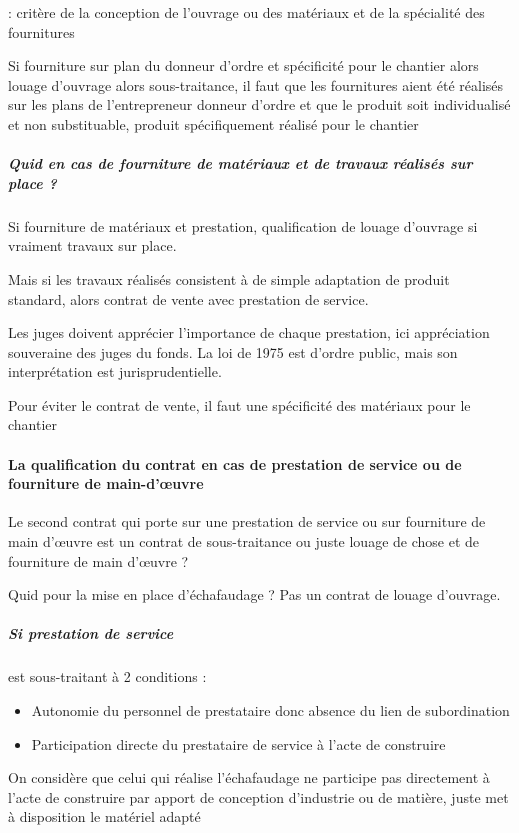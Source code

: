 				  : critère de la conception de l’ouvrage ou des matériaux et de la spécialité des fournitures


				Si fourniture sur plan du donneur d’ordre et spécificité pour le chantier alors louage d’ouvrage alors sous-traitance, il faut que les fournitures aient été réalisés sur les plans de l’entrepreneur donneur d’ordre et que le produit soit individualisé et non substituable, produit spécifiquement réalisé pour le chantier

				\subparagraph{Quid en cas de fourniture de matériaux et de travaux réalisés sur place ?}

				Si fourniture de matériaux et prestation, qualification de louage d’ouvrage si vraiment travaux sur place.


				Mais si les travaux réalisés consistent à de simple adaptation de produit standard, alors contrat de vente avec prestation de service.


				Les juges doivent apprécier l’importance de chaque prestation, ici appréciation souveraine des juges du fonds.
				La loi de 1975 est d’ordre public, mais son interprétation est jurisprudentielle.

				Pour éviter le contrat de vente, il faut une spécificité des matériaux pour le chantier



			\paragraph{La qualification du contrat en cas de prestation de service ou de fourniture de main-d'œuvre}

				Le second contrat qui porte sur une prestation de service ou sur fourniture de main d’œuvre est un contrat de sous-traitance ou juste louage de chose et de fourniture de main d’œuvre ?

				\begin{exemple}
					Quid pour la mise en place d’échafaudage ?
Pas un contrat de louage d’ouvrage.

				\end{exemple}

				\subparagraph{Si prestation de service} est sous-traitant à 2 conditions :

				\begin{itemize}
					\item Autonomie du personnel de prestataire donc absence du lien de subordination

					\item Participation directe du prestataire de service à l’acte de construire

				\end{itemize}
				On considère que celui qui réalise l’échafaudage ne participe pas directement à l’acte de construire par apport de conception d’industrie ou de matière, juste met à disposition le matériel adapté

